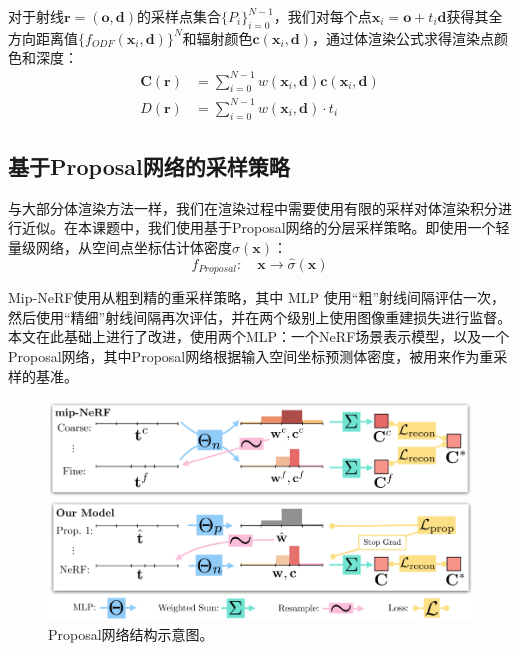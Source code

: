 对于射线$\mathbf{r} = (\mathbf{o},\mathbf{d})$的采样点集合$\{P_i\}_{i=0}^{N-1}$，我们对每个点$\mathbf{x}_i=\mathbf{o}+t_i\mathbf{d}$获得其全方向距离值$\{f_{ODF}(\mathbf{x}_i,\mathbf{d})\}^N$和辐射颜色$\mathbf{c}(\mathbf{x}_i,\mathbf{d})$，通过体渲染公式求得渲染点颜色和深度：
\begin{align}
    \mathbf{C}(\mathbf{r}) &= \sum_{i=0}^{N-1}w(\mathbf{x}_i,\mathbf{d})\mathbf{c}(\mathbf{x}_i,\mathbf{d})\\
    D(\mathbf{r}) &= \sum_{i=0}^{N-1}w(\mathbf{x}_i,\mathbf{d})\cdot t_i
\end{align}

\subsection{基于Proposal网络的采样策略}
与大部分体渲染方法一样，我们在渲染过程中需要使用有限的采样对体渲染积分进行近似。在本课题中，我们使用基于Proposal网络的分层采样策略。即使用一个轻量级网络，从空间点坐标估计体密度$\hat{\sigma}(\mathbf{x})$：
\begin{equation}
    f_{Proposal}:\quad \mathbf{x}\to\hat{\sigma}(\mathbf{x})
\end{equation}

Mip-NeRF\cite{barron_mip-nerf_2021}使用从粗到精的重采样策略，其中 MLP 使用“粗”射线间隔评估一次，然后使用“精细”射线间隔再次评估，并在两个级别上使用图像重建损失进行监督。本文在此基础上进行了改进，使用两个MLP：一个NeRF场景表示模型，以及一个Proposal网络，其中Proposal网络根据输入空间坐标预测体密度，被用来作为重采样的基准。

\begin{figure}[ht]
    \centering
    \includegraphics[width=\textwidth]{undergraduate-thesis/images/omni-nerf/mip-nerf360 proposal network.png}
    \caption{Proposal网络结构示意图。}
    \label{fig:related-work proposal network}
\end{figure}

